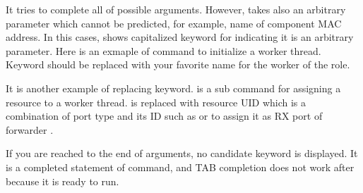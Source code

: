 \documentclass[a4paper,11pt,openany,oneside,english]{sphinxmanual}
\begin{document}
\begin{sphinxVerbatim}[commandchars=\\\{\},formatcom=\footnotesize]
\end{sphinxVerbatim}

It tries to complete all of possible arguments. However,  takes
also an arbitrary parameter which cannot be predicted, for example, name of
component MAC address. In this cases,  shows capitalized keyword
for indicating it is an arbitrary parameter. Here is an exmaple of
 command to initialize a worker thread. Keyword  should
be replaced with your favorite name for the worker of the role.

\begin{sphinxVerbatim}[commandchars=\\\{\},formatcom=\footnotesize]
\end{sphinxVerbatim}

It is another example of replacing keyword.  is a sub command for
assigning a resource to a worker thread.  is replaced with
resource UID which is a combination of port type and its ID such as
 or  to assign it as RX port of forwarder .

\begin{sphinxVerbatim}[commandchars=\\\{\},formatcom=\footnotesize]
\end{sphinxVerbatim}

If you are reached to the end of arguments, no candidate keyword is displayed.
It is a completed statement of  command, and TAB
completion does not work after  because it is ready to run.
\end{document}

